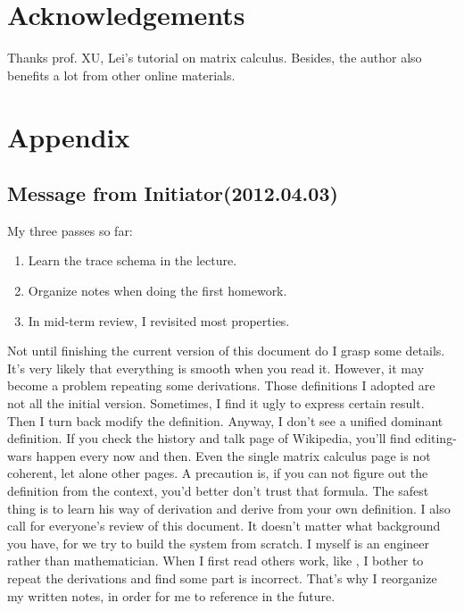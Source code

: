 \pagebreak

\section*{Acknowledgements}
Thanks prof. XU, Lei's tutorial on matrix calculus\cite{xu2012-mlt}. 
Besides, the author also benefits a lot from other online 
materials. 



\section*{Appendix}

\subsection*{Message from Initiator(2012.04.03)}

My three passes so far:
\begin{enumerate}
	\item Learn the trace schema in the lecture. 
	\item Organize notes when doing the first homework. 
	\item In mid-term review, I revisited most properties. 
\end{enumerate}
Not until finishing the current version of this document do 
I grasp some details. It's very likely that everything is 
smooth when you read it. However, it may become a problem
repeating some derivations. Those definitions I adopted 
are not all the initial version. Sometimes, I find it ugly 
to express certain result. Then I turn back modify the definition. 
Anyway, I don't see a unified dominant definition. If you check 
the history and talk page of Wikipedia\cite{wiki_mc}, you'll find editing-wars
happen every now and then. Even the single matrix calculus page
is not coherent\cite{wiki_mc}, let alone other pages. A precaution 
is, if you can not figure out the definition from the context, 
you'd better don't trust that formula. The safest thing is to learn
his way of derivation and derive from your own definition. 
I also call for everyone's review of this document. It doesn't matter
what background you have, for we try to build the system from 
scratch. I myself is an engineer rather than mathematician. 
When I first read others work, like \cite{finite_appendix_mc}, 
I bother to repeat the derivations and find some part is 
incorrect. That's why I reorganize my written notes, 
in order for me to reference in the future. 

